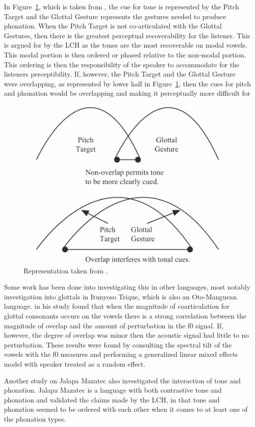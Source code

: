 \documentclass[12pt, letterpaper]{article}
\begin{document}
In Figure~\ref{fig:GlottalGestures}, which is taken from \citet{dicanioCoarticulationToneGlottal2012}, the cue for tone is represented by the Pitch Target and the Glottal Gesture represents the gestures needed to produce phonation. When the Pitch Target is not co-articulated with the Glottal Gestures, then there is the greatest perceptual recoverability for the listener. This is argued for by the LCH as the tones are the most recoverable on modal vowels. This modal portion is then ordered or phased relative to the non-modal portion. This ordering is then the responsibility of the speaker to accommodate for the listeners perceptibility. If, however, the Pitch Target and the Glottal Gesture were overlapping, as represented by lower half in Figure~\ref{fig:GlottalGestures}, then the cues for pitch and phonation would be overlapping and making it perceptually more difficult for 
\begin{figure}[!ht]
	\centering
	\includegraphics[width=.5\textwidth]{../Gestures.png}
	\caption{Representation taken from \citet{dicanioCoarticulationToneGlottal2012}.}
	\label{fig:GlottalGestures}
\end{figure}

Some work has been done into investigating this in other languages, most notably  investigation into glottals in Itunyoso Trique, which is also an Oto-Manguean language. \citeauthor{dicanioCoarticulationToneGlottal2012} in his study found that when the magnitude of coarticulation for glottal consonants occurs on the vowels there is a strong correlation between the magnitude of overlap and the amount of perturbation in the f0 signal. If, however, the degree of overlap was minor then the acoustic signal had little to no perturbation. These results were found by consulting the spectral tilt of the vowels with the f0 measures and performing a generalized linear mixed effects model with speaker treated as a random effect. 

Another study on Jalapa Mazatec \citep{garellekAcousticConsequencesPhonation2011} also investigated the interaction of tone and phonation. Jalapa Mazatec is a language with both contrastive tone and phonation and \citet{garellekAcousticConsequencesPhonation2011} validated the claims made by the LCH, in that tone and phonation seemed to be ordered with each other when it comes to at least one of the phonation types.
\end{document}
